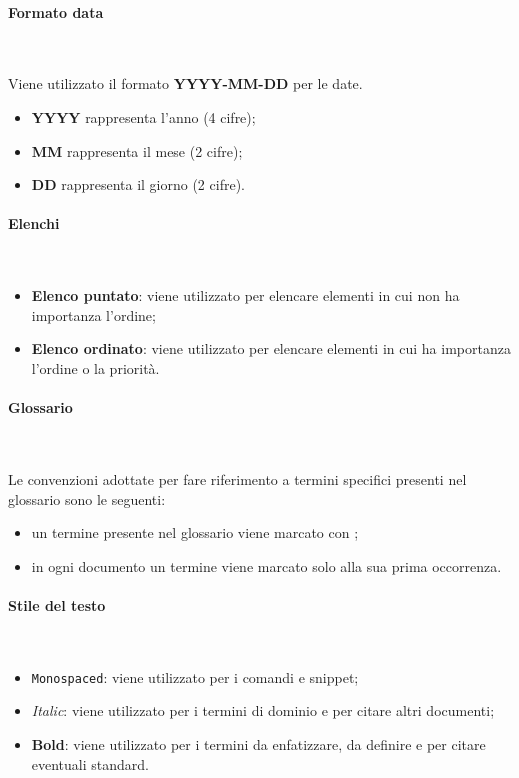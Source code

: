 \paragraph{Formato data} ~

Viene utilizzato il formato \textbf{YYYY-MM-DD} per le date.
\begin{itemize}
    \item \textbf{YYYY} rappresenta l'anno (4 cifre);
    \item \textbf{MM} rappresenta il mese (2 cifre);
    \item \textbf{DD} rappresenta il giorno (2 cifre).
\end{itemize}

\paragraph{Elenchi} ~

\begin{itemize}
    \item \textbf{Elenco puntato}: viene utilizzato per elencare elementi in cui non ha importanza l'ordine;
    \item \textbf{Elenco ordinato}: viene utilizzato per elencare elementi in cui ha importanza l'ordine o la priorità.
\end{itemize}

\paragraph{Glossario} ~

Le convenzioni adottate per fare riferimento a termini specifici presenti nel glossario sono le seguenti:
\begin{itemize}
    \item un termine presente nel glossario viene marcato con \glo ;
    \item in ogni documento un termine viene marcato solo alla sua prima occorrenza.
\end{itemize}

\paragraph{Stile del testo} ~

\begin{itemize}
    \item \texttt{Monospaced}: viene utilizzato per i comandi e snippet;
    \item \textit{Italic}: viene utilizzato per i termini di dominio e per citare altri documenti;
    \item \textbf{Bold}: viene utilizzato per i termini da enfatizzare, da definire e per citare eventuali standard.
\end{itemize}

